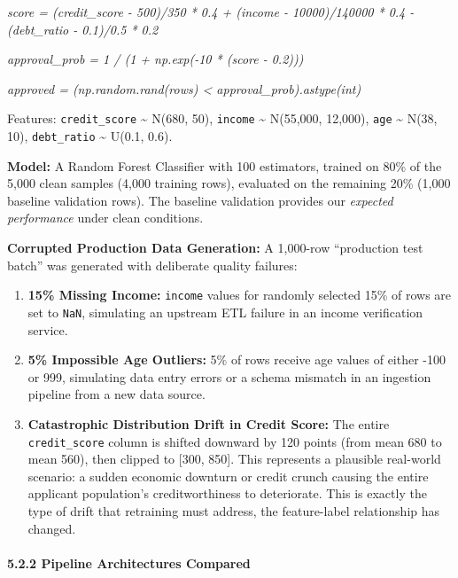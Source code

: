 \documentclass{article}
\begin{document}
\emph{score = (credit\_score - 500)/350 * 0.4 + (income - 10000)/140000
* 0.4 - (debt\_ratio - 0.1)/0.5 * 0.2}

\emph{approval\_prob = 1 / (1 + np.exp(-10 * (score - 0.2)))}

\emph{approved = (np.random.rand(rows) < 
approval\_prob).astype(int)}

Features: \texttt{credit\_score} \textasciitilde{} N(680, 50),
\texttt{income} \textasciitilde{} N(55,000, 12,000), \texttt{age}
\textasciitilde{} N(38, 10), \texttt{debt\_ratio} \textasciitilde{}
U(0.1, 0.6).

\textbf{Model:} A Random Forest Classifier with 100 estimators, trained
on 80\% of the 5,000 clean samples (4,000 training rows), evaluated on
the remaining 20\% (1,000 baseline validation rows). The baseline
validation provides our \emph{expected performance} under clean
conditions.

\textbf{Corrupted Production Data Generation:} A 1,000-row ``production
test batch'' was generated with deliberate quality failures:

\begin{enumerate}
\def\labelenumi{\arabic{enumi}.}
\item
  \textbf{15\% Missing Income:} \texttt{income} values for randomly
  selected 15\% of rows are set to \texttt{NaN}, simulating an upstream
  ETL failure in an income verification service.
\item
  \textbf{5\% Impossible Age Outliers:} 5\% of rows receive age values
  of either -100 or 999, simulating data entry errors or a schema
  mismatch in an ingestion pipeline from a new data source.
\item
  \textbf{Catastrophic Distribution Drift in Credit Score:} The entire
  \texttt{credit\_score} column is shifted downward by 120 points (from
  mean 680 to mean 560), then clipped to {[}300, 850{]}. This represents
  a plausible real-world scenario: a sudden economic downturn or credit
  crunch causing the entire applicant population's creditworthiness to
  deteriorate. This is exactly the type of drift that retraining must
  address, the feature-label relationship has changed.
\end{enumerate}

\paragraph{5.2.2 Pipeline Architectures
Compared}\label{pipeline-architectures-compared}
\end{document}
